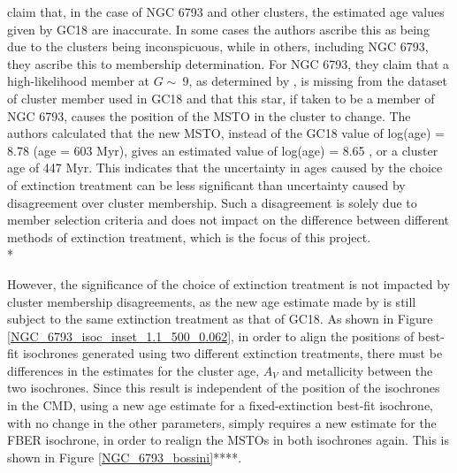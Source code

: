 \documentclass[12pt, a4paper]{report}
\begin{document}
\cite{2019A&A...623A.108B} claim that, in the case of NGC 6793 and other clusters, the estimated age values given by GC18 are inaccurate. In some cases the authors ascribe this as being due to the clusters being inconspicuous, while in others, including NGC 6793, they ascribe this to membership determination. For NGC 6793, they claim that a high-likelihood member at $G \sim\ 9$, as determined by \cite{2018A&A...618A..93C}, is missing from the dataset of cluster member used in GC18 and that this star, if taken to be a member of NGC 6793, causes the position of the MSTO in the cluster to change. The authors calculated that the new MSTO, instead of the GC18 value of log(age) = 8.78 (age = 603 Myr), gives an estimated value of log(age) = 8.65 , or a cluster age of 447 Myr. This indicates that the uncertainty in ages caused by the choice of extinction treatment can be less significant than uncertainty caused by disagreement over cluster membership. Such a disagreement is solely due to member selection criteria and does not impact on the difference between different methods of extinction treatment, which is the focus of this project. \\*

However, the significance of the choice of extinction treatment is not impacted by cluster membership disagreements, as the new age estimate made by \cite{2019A&A...623A.108B} is still subject to the same extinction treatment as that of GC18. As shown in Figure \ref{NGC_6793_isoc_inset_1.1_500_0.062}, in order to align the positions of best-fit isochrones generated using two different extinction treatments, there must be differences in the estimates for the cluster age, $A_{V}$ and metallicity between the two isochrones. Since this result is independent of the position of the isochrones in the CMD, using a new age estimate for a fixed-extinction best-fit isochrone, with no change in the other parameters, simply requires a new estimate for the FBER isochrone, in order to realign the MSTOs in both isochrones again. This is shown in Figure \ref{NGC_6793_bossini}****.
\end{document}
